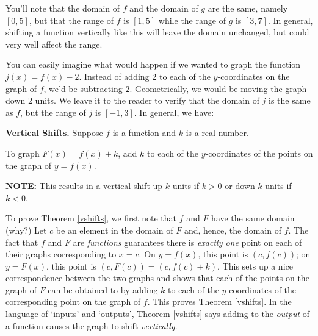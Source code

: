 \documentclass{ximera}
\begin{document}
 
You'll note that the domain of $f$ and the domain of $g$ are the same, namely $[0,5]$, but that the range of $f$ is $[1,5]$ while the range of $g$ is $[3,7]$.  In general, shifting a function vertically like this will leave the domain unchanged, but could very well affect the range.  

\smallskip

You can easily imagine what would happen if we wanted to graph the function $j(x) = f(x) - 2$.  Instead of adding $2$ to each of the $y$-coordinates on the graph of $f$, we'd be subtracting $2$.  Geometrically, we would be moving the graph down $2$ units.  We leave it to the reader to verify that the domain of $j$ is the same as $f$, but the range of $j$ is $[-1,3]$.  In general, we have:

\smallskip



\begin{theorem} \label{vshifts} \textbf{Vertical Shifts.} Suppose $f$ is a function and $k$ is a real number. 

To graph $F(x) = f(x) + k$,  add $k$ to each of the $y$-coordinates of the points on the graph of $y=f(x)$.

\textbf{NOTE:}  This results in a vertical shift up $k$ units if $k > 0$ or down $k$ units if $k< 0$.


\end{theorem}


\smallskip

To prove Theorem \ref{vshifts}, we first note that $f$ and $F$ have the same domain (why?)  Let $c$ be an element in the domain of $F$ and, hence, the domain of $f$.  The fact that $f$ and $F$ are \textit{functions} guarantees  there is \textit{exactly one} point on each of their  graphs corresponding to $x=c$.  On $y=f(x)$, this point is $(c, f(c))$;  on $y = F(x)$, this point is  $(c, F(c)) = (c, f(c)+k)$.  This sets up a nice correspondence between the two graphs and shows that each of the points on the graph of $F$ can be obtained to by adding $k$ to each of the $y$-coordinates of the corresponding point on the graph  of $f$.  This  proves  Theorem \ref{vshifts}.   In the language of `inputs' and `outputs', Theorem \ref{vshifts} says adding to the \textit{output} of a function causes the graph to shift \textit{vertically}. 
 
\smallskip
\end{document}
